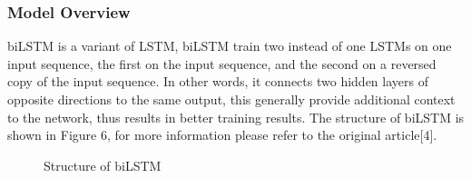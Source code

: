 \documentclass{article}
\begin{document}
\subsubsection{Model Overview}
biLSTM is a variant of LSTM, biLSTM train two instead of one LSTMs on one input sequence, the first on the input sequence, and the second on a reversed copy of the input sequence. In other words, it connects two hidden layers of opposite directions to the same output, this generally provide additional context to the network, thus results in better training results. The structure of biLSTM is shown in Figure 6, for more information please refer to the original article[4].
\begin{figure}[h]
  \centering
  \caption{Structure of biLSTM}
\end{figure}
\end{document}
